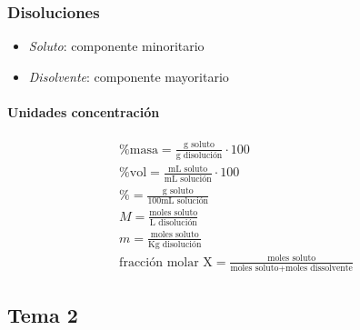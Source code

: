 \documentclass[a4paper,12pt]{article}
\begin{document}
\subsubsection{Disoluciones}
\begin{itemize}
    \item \emph{Soluto}: componente minoritario
    \item \emph{Disolvente}: componente mayoritario
\end{itemize}
\paragraph{Unidades concentración}
\begin{gather}     
    \%\text{masa}=\frac{\text{g soluto}}{\text{g disolución}}\cdot100\\
    \%\text{vol}=\frac{\text{mL soluto}}{\text{mL solución}}\cdot100\\
    \%=\frac{\text{g soluto}}{\text{100mL solución}}\\
    M=\frac{\text{moles soluto}}{\text{L disolución}}\\
    m=\frac{\text{moles soluto}}{\text{Kg disolución}}\\
    \text{fracción molar X}=\frac{\text{moles soluto}}{\text{moles soluto}+\text{moles dissolvente}}
\end{gather}
\subsection{Tema 2}
\end{document}
